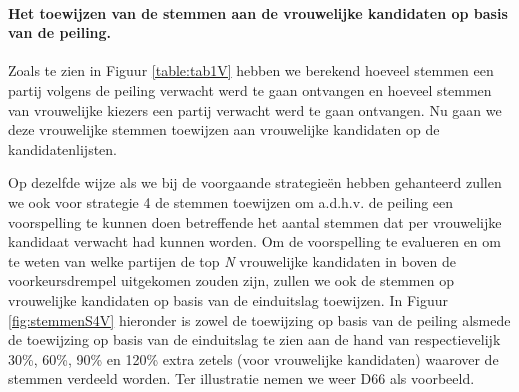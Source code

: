 \paragraph{Het toewijzen van de stemmen aan de vrouwelijke kandidaten op basis van de peiling.}
Zoals te zien in Figuur \ref{table:tab1V} hebben we berekend hoeveel stemmen een partij volgens de peiling verwacht werd te gaan ontvangen en hoeveel stemmen van vrouwelijke kiezers een partij verwacht werd te gaan ontvangen. Nu gaan we deze vrouwelijke stemmen toewijzen aan vrouwelijke kandidaten op de kandidatenlijsten.

Op dezelfde wijze als we bij de voorgaande strategie\"{e}n hebben gehanteerd zullen we ook voor strategie 4 de stemmen toewijzen om a.d.h.v. de peiling een voorspelling te kunnen doen betreffende het aantal stemmen dat per vrouwelijke kandidaat verwacht had kunnen worden. Om de voorspelling te evalueren en om te weten van welke partijen de top \textit{N} vrouwelijke kandidaten in boven de voorkeursdrempel uitgekomen zouden zijn, zullen we ook de stemmen op vrouwelijke kandidaten op basis van de einduitslag toewijzen. In Figuur \ref{fig:stemmenS4V} hieronder is zowel de toewijzing op basis van de peiling alsmede de toewijzing op basis van de einduitslag te zien aan de hand van respectievelijk 30\%, 60\%, 90\% en 120\% extra zetels (voor vrouwelijke kandidaten) waarover de stemmen verdeeld worden. Ter illustratie nemen we weer D66 als voorbeeld. 

